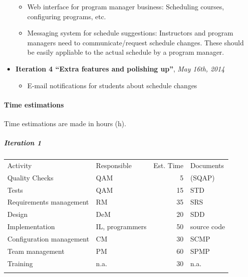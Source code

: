 \documentclass[12pt]{article}
\begin{document}
\begin{itemize}
  \begin{itemize}
  \itemsep1pt\parskip0pt
  \item
    Web interface for program manager business: Scheduling courses,
    configuring programs, etc.
  \item
    Messaging system for schedule suggestions: Instructors and program
    managers need to communicate/request schedule changes. These should
    be easily appliable to the actual schedule by a program manager.
  \end{itemize}
\item
  \textbf{Iteration 4 ``Extra features and polishing up''}, \emph{May
  16th, 2014}

  \begin{itemize}
  \itemsep1pt\parskip0pt
  \item
    E-mail notifications for students about schedule changes
  \end{itemize}
\end{itemize}

\paragraph{Time estimations}\label{time-estimations}

Time estimations are made in hours (h).

\subparagraph{Iteration 1}\label{iteration-1}

\begin{longtable}[c]{@{}llrl@{}}
\hline\noalign{\medskip}
Activity & Responsible & Est. Time & Documents
\\\noalign{\medskip}
\hline\noalign{\medskip}
Quality Checks & QAM & 5 & (SQAP)
\\\noalign{\medskip}
Tests & QAM & 15 & STD
\\\noalign{\medskip}
Requirements management & RM & 35 & SRS
\\\noalign{\medskip}
Design & DeM & 20 & SDD
\\\noalign{\medskip}
Implementation & IL, programmers & 50 & source code
\\\noalign{\medskip}
Configuration management & CM & 30 & SCMP
\\\noalign{\medskip}
Team management & PM & 60 & SPMP
\\\noalign{\medskip}
Training & n.a. & 30 & n.a.
\\\noalign{\medskip}
\hline
\end{longtable}
\end{document}
